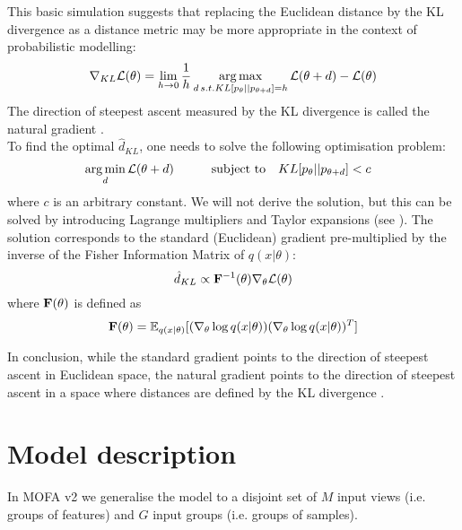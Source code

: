 This basic simulation suggests that replacing the Euclidean distance by the KL divergence as a distance metric may be more appropriate in the context of probabilistic modelling:
\[
	\nabla_{KL} \mathcal{L}(\theta) = \lim_{h\to0} \frac{1}{h}\operatorname*{arg\,max}_{d \, s.t. KL[p_\theta||p_{\theta+d}]=h} \mathcal{L}(\theta+d) - \mathcal{L}(\theta)
\]
The direction of steepest ascent measured by the KL divergence is called the natural gradient \cite{Amari1998,Martens2014}.\\
To find the optimal $\hat{d}_{KL}$, one needs to solve the following optimisation problem:
\begin{equation*} \begin{aligned}
	&\operatorname*{arg\,min}_{d} \mathcal{L}(\theta+d) \qquad
	& \text{subject to}
	& \quad KL[p_\theta||p_{\theta+d}] < c
\end{aligned} \end{equation*}
where $c$ is an arbitrary constant. We will not derive the solution, but this can be solved by introducing Lagrange multipliers and Taylor expansions (see \cite{Amari1998,Kristiadi2019}). The solution corresponds to the standard (Euclidean) gradient pre-multiplied by the inverse of the Fisher Information Matrix of $q(x|\theta)$:
\begin{equation}\label{natural_gradient}
	\hat{d}_{KL} \propto {\bf F}^{-1}(\theta) \nabla_{\theta} \mathcal{L}(\theta)
\end{equation}
where ${\bf F}(\theta)$ is defined as
\[
	{\bf F}(\theta) = \mathbb{E}_{q(x|\theta)}[(\nabla_\theta \log q(x|\theta)) (\nabla_\theta \log q(x|\theta))^T]
\]


In conclusion, while the standard gradient points to the direction of steepest ascent in Euclidean space, the natural gradient points to the direction of steepest ascent in a space where distances are defined by the KL divergence \cite{Kristiadi2019,Amari1998,Hoffman2012}.


\section{Model description}

In MOFA v2 we generalise the model to a disjoint set of $M$ input views (i.e. groups of features) and $G$ input groups (i.e. groups of samples).\\

